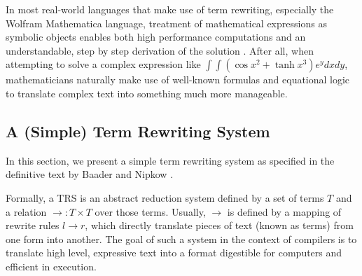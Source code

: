 \documentclass{article}
\begin{document}
In most real-world languages that make use of term rewriting, especially the Wolfram Mathematica language,
treatment of mathematical expressions as symbolic objects enables both high performance computations
and an understandable, step by step derivation of the solution \cite{buchberger1996mathematica,mircea2004rule}. After all, when attempting to solve
a complex expression like $\int \int (\cos{x}^2 + \tanh{x}^3)e^y dx dy$, mathematicians naturally make use
of well-known formulas and equational logic to translate complex text into something much more manageable.












\subsection{A (Simple) Term Rewriting System}

In this section, we present a simple term rewriting system as specified in the definitive text by Baader and Nipkow \cite{baader1998term}.

Formally, a TRS is an abstract reduction system defined by a set of terms $T$ and a relation $\rightarrow: T \times T$ over those terms.
Usually, $\rightarrow$ is defined by a mapping of rewrite rules $l \rightarrow r$, which directly translate pieces of text (known as terms) from one form into another.
The goal of such a system in the context of compilers is to translate high level, expressive text into a format digestible for computers and efficient in execution.
\end{document}
